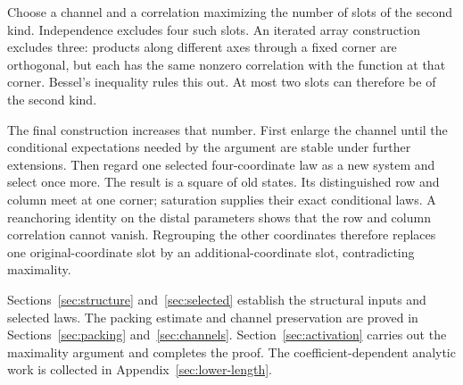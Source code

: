Choose a channel and a correlation maximizing the number of slots of
the second kind. Independence excludes four such slots. An iterated
array construction excludes three: products along different axes
through a fixed corner are orthogonal, but each has the same nonzero
correlation with the function at that corner. Bessel's inequality
rules this out. At most two slots can therefore be of the second kind.

The final construction increases that number. First enlarge the
channel until the conditional expectations needed by the argument
are stable under further extensions. Then regard one selected
four-coordinate law as a new system and select once more. The result
is a square of old states. Its distinguished row and column meet at
one corner; saturation supplies their exact conditional laws. A
reanchoring identity on the distal parameters shows that the row and
column correlation cannot vanish. Regrouping the other coordinates
therefore replaces one original-coordinate slot by an
additional-coordinate slot, contradicting maximality.

Sections~\ref{sec:structure} and~\ref{sec:selected} establish the
structural inputs and selected laws. The packing estimate and channel
preservation are proved in Sections~\ref{sec:packing}
and~\ref{sec:channels}. Section~\ref{sec:activation} carries out the
maximality argument and completes the proof. The coefficient-dependent
analytic work is collected in Appendix~\ref{sec:lower-length}.
